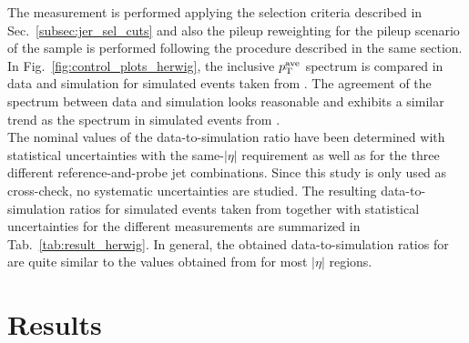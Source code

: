 The measurement is performed applying the selection criteria described in Sec.~\ref{subsec:jer_sel_cuts} and also the pileup reweighting for the pileup scenario of the \herwig sample is performed following the procedure described in the same section. In Fig.~\ref{fig:control_plots_herwig}, the inclusive $p_{\text{T}}^\mathrm{ave}$ spectrum is compared in data and simulation for simulated events taken from \herwig. The agreement of the \ptave spectrum between data and simulation looks reasonable and exhibits a similar trend as the spectrum in simulated events from \pythia.\\
The nominal values of the data-to-simulation ratio have been determined with statistical uncertainties with the same-$|\eta|$ requirement as well as for the three different reference-and-probe jet combinations. Since this study is only used as cross-check, no systematic uncertainties are studied. The resulting data-to-simulation ratios for simulated events taken from \herwig together with statistical uncertainties for the different measurements are summarized in Tab.~\ref{tab:result_herwig}. In general, the obtained data-to-simulation ratios for \herwig are quite similar to the values obtained from \pythia for most $|\eta|$ regions. 

\section{Results}
\label{sec:jer_results}

